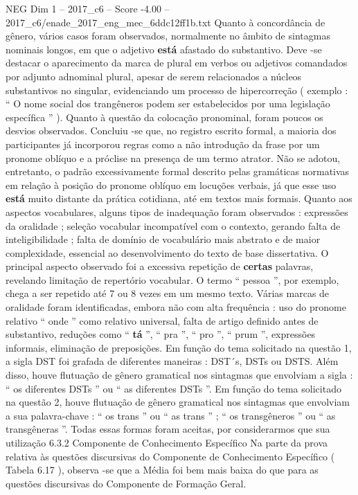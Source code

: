 \begin{textsample}{NEG Dim 1 – 2017\_c6 – Score -4.00 – 2017\_c6/enade\_2017\_eng\_mec\_6ddc12ff1b.txt}
Quanto à concordância de gênero, vários casos foram observados, normalmente no âmbito de sintagmas nominais longos, em que o adjetivo \textbf{está} afastado do substantivo.
Deve -se destacar o aparecimento da marca de plural em verbos ou adjetivos comandados por adjunto adnominal plural, apesar de serem relacionados a núcleos substantivos no singular, evidenciando um processo de hipercorreção ( exemplo : “ O nome social dos trangêneros podem ser estabelecidos por uma legislação específica ” ).
Quanto à questão da colocação pronominal, foram poucos os desvios observados.
Concluiu -se que, no registro escrito formal, a maioria dos participantes já incorporou regras como a não introdução da frase por um pronome oblíquo e a próclise na presença de um termo atrator.
Não se adotou, entretanto, o padrão excessivamente formal descrito pelas gramáticas normativas em relação à posição do pronome oblíquo em locuções verbais, já que esse uso \textbf{está} muito distante da prática cotidiana, até em textos mais formais.
Quanto aos aspectos vocabulares, alguns tipos de inadequação foram observados : expressões da oralidade ; seleção vocabular incompatível com o contexto, gerando falta de inteligibilidade ; falta de domínio de vocabulário mais abstrato e de maior complexidade, essencial ao desenvolvimento do texto de base dissertativa.
O principal aspecto observado foi a excessiva repetição de \textbf{certas} palavras, revelando limitação de repertório vocabular.
O termo “ pessoa ”, por exemplo, chega a ser repetido até 7 ou 8 vezes em um mesmo texto.
Várias marcas de oralidade foram identificadas, embora não com alta frequência : uso do pronome relativo “ onde ” como relativo universal, falta de artigo definido antes de substantivo, reduções como “ \textbf{tá} ”, “ pra ”, “ pro ”, “ prum ”, expressões informais, eliminação de preposições.
Em função do tema solicitado na questão 1, a sigla DST foi grafada de diferentes maneiras : DST´s, DSTs ou DSTS.
Além disso, houve flutuação de gênero gramatical nos sintagmas que envolviam a sigla : “ os diferentes DSTs ” ou “ as diferentes DSTs ”.
Em função do tema solicitado na questão 2, houve flutuação de gênero gramatical nos sintagmas que envolviam a sua palavra-chave : “ os trans ” ou “ as trans ” ; “ os transgêneros ” ou “ as transgêneras ”.
Todas essas formas foram aceitas, por considerarmos que sua utilização 6.3.2 Componente de Conhecimento Específico Na parte da prova relativa às questões discursivas do Componente de Conhecimento Específico ( Tabela 6.17 ), observa -se que a Média foi bem mais baixa do que para as questões discursivas do Componente de Formação Geral.

\end{textsample}
